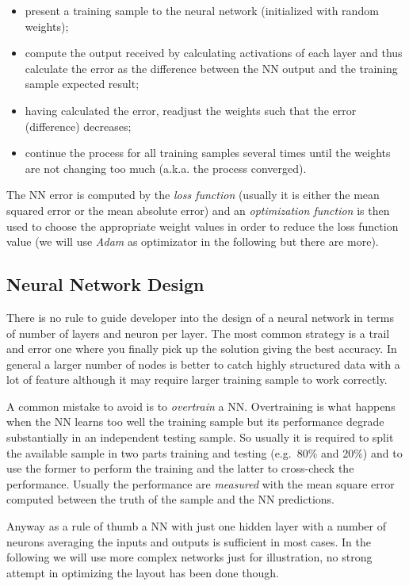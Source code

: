 \begin{itemize}
\tightlist
\item
  present a training sample to the neural network (initialized with
  random weights);
\item
  compute the output received by calculating activations of each layer
  and thus calculate the error as the difference between the NN output
  and the training sample expected result;
\item
  having calculated the error, readjust the weights such that the error
  (difference) decreases;
\item
  continue the process for all training samples several times until the
  weights are not changing too much (a.k.a. the process converged).
\end{itemize}

The NN error is computed by the \emph{loss function} (usually it is
either the mean squared error or the mean absolute error) and an
\emph{optimization function} is then used to choose the appropriate
weight values in order to reduce the loss function value (we will use
\emph{Adam} as optimizator in the following but there are more).

\subsection{Neural Network Design}\label{neural-network-design}

There is no rule to guide developer into the design of a neural network
in terms of number of layers and neuron per layer. The most common
strategy is a trail and error one where you finally pick up the solution
giving the best accuracy. In general a larger number of nodes is better
to catch highly structured data with a lot of feature although it may
require larger training sample to work correctly.

A common mistake to avoid is to \emph{overtrain} a NN. Overtraining is
what happens when the NN learns too well the training sample but its
performance degrade substantially in an independent testing sample. So
usually it is required to split the available sample in two parts
training and testing (e.g.~80\% and 20\%) and to use the former to
perform the training and the latter to cross-check the performance.
Usually the performance are \emph{measured} with the mean square error
computed between the truth of the sample and the NN predictions.

Anyway as a rule of thumb a NN with just one hidden layer with a number
of neurons averaging the inputs and outputs is sufficient in most cases.
In the following we will use more complex networks just for
illustration, no strong attempt in optimizing the layout has been done
though.

